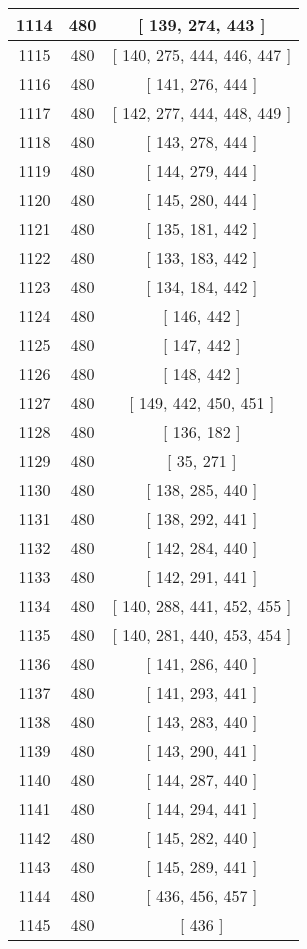 \begin{center}
\begin{longtable}[H]{|| c c c ||}
\hline
1114 & 480 & [ 139, 274, 443 ] \\ 
\hline
1115 & 480 & [ 140, 275, 444, 446, 447 ] \\ 
\hline
1116 & 480 & [ 141, 276, 444 ] \\ 
\hline
1117 & 480 & [ 142, 277, 444, 448, 449 ] \\ 
\hline
1118 & 480 & [ 143, 278, 444 ] \\ 
\hline
1119 & 480 & [ 144, 279, 444 ] \\ 
\hline
1120 & 480 & [ 145, 280, 444 ] \\ 
\hline
1121 & 480 & [ 135, 181, 442 ] \\ 
\hline
1122 & 480 & [ 133, 183, 442 ] \\ 
\hline
1123 & 480 & [ 134, 184, 442 ] \\ 
\hline
1124 & 480 & [ 146, 442 ] \\ 
\hline
1125 & 480 & [ 147, 442 ] \\ 
\hline
1126 & 480 & [ 148, 442 ] \\ 
\hline
1127 & 480 & [ 149, 442, 450, 451 ] \\ 
\hline
1128 & 480 & [ 136, 182 ] \\ 
\hline
1129 & 480 & [ 35, 271 ] \\ 
\hline
1130 & 480 & [ 138, 285, 440 ] \\ 
\hline
1131 & 480 & [ 138, 292, 441 ] \\ 
\hline
1132 & 480 & [ 142, 284, 440 ] \\ 
\hline
1133 & 480 & [ 142, 291, 441 ] \\ 
\hline
1134 & 480 & [ 140, 288, 441, 452, 455 ] \\ 
\hline
1135 & 480 & [ 140, 281, 440, 453, 454 ] \\ 
\hline
1136 & 480 & [ 141, 286, 440 ] \\ 
\hline
1137 & 480 & [ 141, 293, 441 ] \\ 
\hline
1138 & 480 & [ 143, 283, 440 ] \\ 
\hline
1139 & 480 & [ 143, 290, 441 ] \\ 
\hline
1140 & 480 & [ 144, 287, 440 ] \\ 
\hline
1141 & 480 & [ 144, 294, 441 ] \\ 
\hline
1142 & 480 & [ 145, 282, 440 ] \\ 
\hline
1143 & 480 & [ 145, 289, 441 ] \\ 
\hline
1144 & 480 & [ 436, 456, 457 ] \\ 
\hline
1145 & 480 & [ 436 ] \\ 

\end{longtable}
\end{center}
